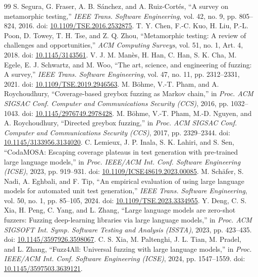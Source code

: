 \documentclass[acmsmall,screen,anonymous]{acmart}
\begin{document}
\begin{thebibliography}{99}
 S. Segura, G. Fraser, A. B. Sánchez, and A. Ruiz-Cortés, ``A survey on metamorphic testing,'' \emph{IEEE Trans. Software Engineering}, vol. 42, no. 9, pp. 805--824, 2016. doi: \href{https://doi.org/10.1109/TSE.2016.2532875}{10.1109/TSE.2016.2532875}.
 T. Y. Chen, F.-C. Kuo, H. Liu, P.-L. Poon, D. Towey, T. H. Tse, and Z. Q. Zhou, ``Metamorphic testing: A review of challenges and opportunities,'' \emph{ACM Computing Surveys}, vol. 51, no. 1, Art. 4, 2018. doi: \href{https://doi.org/10.1145/3143561}{10.1145/3143561}.
 V. J. M. Manès, H. Han, C. Han, S. K. Cha, M. Egele, E. J. Schwartz, and M. Woo, ``The art, science, and engineering of fuzzing: A survey,'' \emph{IEEE Trans. Software Engineering}, vol. 47, no. 11, pp. 2312--2331, 2021. doi: \href{https://doi.org/10.1109/TSE.2019.2946563}{10.1109/TSE.2019.2946563}.
 M. Böhme, V.-T. Pham, and A. Roychoudhury, ``Coverage-based greybox fuzzing as Markov chain,'' in \emph{Proc. ACM SIGSAC Conf. Computer and Communications Security (CCS)}, 2016, pp. 1032--1043. doi: \href{https://doi.org/10.1145/2976749.2978428}{10.1145/2976749.2978428}.
 M. Böhme, V.-T. Pham, M.-D. Nguyen, and A. Roychoudhury, ``Directed greybox fuzzing,'' in \emph{Proc. ACM SIGSAC Conf. Computer and Communications Security (CCS)}, 2017, pp. 2329--2344. doi: \href{https://doi.org/10.1145/3133956.3134020}{10.1145/3133956.3134020}.
 C. Lemieux, J. P. Inala, S. K. Lahiri, and S. Sen, ``CodaMOSA: Escaping coverage plateaus in test generation with pre-trained large language models,'' in \emph{Proc. IEEE/ACM Int. Conf. Software Engineering (ICSE)}, 2023, pp. 919--931. doi: \href{https://doi.org/10.1109/ICSE48619.2023.00085}{10.1109/ICSE48619.2023.00085}.
 M. Schäfer, S. Nadi, A. Eghbali, and F. Tip, ``An empirical evaluation of using large language models for automated unit test generation,'' \emph{IEEE Trans. Software Engineering}, vol. 50, no. 1, pp. 85--105, 2024. doi: \href{https://doi.org/10.1109/TSE.2023.3334955}{10.1109/TSE.2023.3334955}.
 Y. Deng, C. S. Xia, H. Peng, C. Yang, and L. Zhang, ``Large language models are zero-shot fuzzers: Fuzzing deep-learning libraries via large language models,'' in \emph{Proc. ACM SIGSOFT Int. Symp. Software Testing and Analysis (ISSTA)}, 2023, pp. 423--435. doi: \href{https://doi.org/10.1145/3597926.3598067}{10.1145/3597926.3598067}.
 C. S. Xia, M. Paltenghi, J. L. Tian, M. Pradel, and L. Zhang, ``Fuzz4All: Universal fuzzing with large language models,'' in \emph{Proc. IEEE/ACM Int. Conf. Software Engineering (ICSE)}, 2024, pp. 1547--1559. doi: \href{https://doi.org/10.1145/3597503.3639121}{10.1145/3597503.3639121}.

\end{thebibliography}
\end{document}
